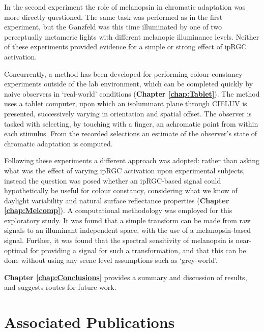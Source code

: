 In the second experiment the role of melanopsin in chromatic adaptation was more directly questioned. The same task was performed as in the first experiment, but the Ganzfeld was this time illuminated by one of two perceptually metameric lights with different melanopic illuminance levels. Neither of these experiments provided evidence for a simple or strong effect of ipRGC activation.

Concurrently, a method has been developed for performing colour constancy experiments outside of the lab environment, which can be completed quickly by naive observers in `real-world' conditions (\textbf{Chapter \ref{chap:Tablet}}). The method uses a tablet computer, upon which an isoluminant plane through CIELUV is presented, successively varying in orientation and spatial offset. The observer is tasked with selecting, by touching with a finger, an achromatic point from within each stimulus. From the recorded selections an estimate of the observer's state of chromatic adaptation is computed.

Following these experiments a different approach was adopted: rather than asking what was the effect of varying \gls{ipRGC} activation upon experimental subjects, instead the question was posed whether an \gls{ipRGC}-based signal could hypothetically be useful for colour constancy, considering what we know of daylight variability and natural surface reflectance properties (\textbf{Chapter \ref{chap:Melcomp}}). A computational methodology was employed for this exploratory study. It was found that a simple transform can be made from raw signals to an illuminant independent space, with the use of a melanopsin-based signal. Further, it was found that the spectral sensitivity of melanopsin is near-optimal for providing a signal for such a transformation, and that this can be done without using any scene level assumptions such as `grey-world'.

\textbf{Chapter \ref{chap:Conclusions}} provides a summary and discussion of results, and suggests routes for future work.

\section{Associated Publications}

